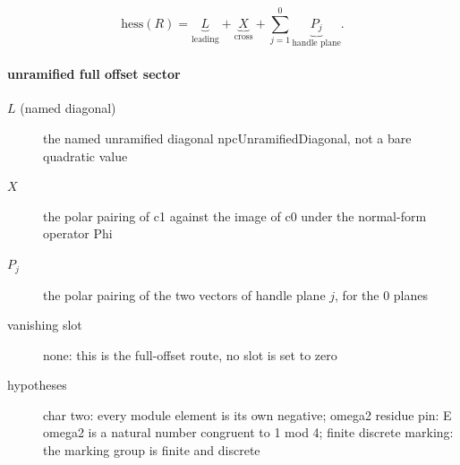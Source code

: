 \[\mathrm{hess}(R)=\underbrace{L}_{\text{leading}}+\underbrace{X}_{\text{cross}}+\sum_{j=1}^{0}\underbrace{P_j}_{\text{handle plane}}.\]
\paragraph{unramified full offset sector}
\begin{description}
\item[$L$ (named diagonal)] the named unramified diagonal npcUnramifiedDiagonal, not a bare quadratic value
\item[$X$] the polar pairing of c1 against the image of c0 under the normal-form operator Phi
\item[$P_j$] the polar pairing of the two vectors of handle plane $j$, for the 0 planes
\item[vanishing slot] none: this is the full-offset route, no slot is set to zero
\item[hypotheses] char two: every module element is its own negative; omega2 residue pin: E omega2 is a natural number congruent to 1 mod 4; finite discrete marking: the marking group is finite and discrete
\end{description}
